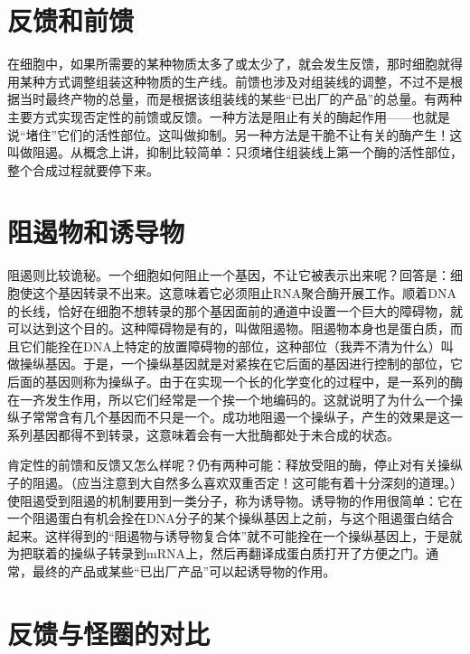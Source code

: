 \section{反馈和前馈}

在细胞中，如果所需要的某种物质太多了或太少了，就会发生反馈，那时细胞就得用某种方式调整组装这种物质的生产线。前馈也涉及对组装线的调整，不过不是根据当时最终产物的总量，而是根据该组装线的某些“已出厂的产品”的总量。有两种主要方式实现否定性的前馈或反馈。一种方法是阻止有关的酶起作用——也就是说“堵住”它们的活性部位。这叫做抑制。另一种方法是干脆不让有关的酶产生！这叫做阻遏。从概念上讲，抑制比较简单：只须堵住组装线上第一个酶的活性部位，整个合成过程就要停下来。

\section{阻遏物和诱导物}

阻遏则比较诡秘。一个细胞如何阻止一个基因，不让它被表示出来呢？回答是：细胞使这个基因转录不出来。这意味着它必须阻止RNA聚合酶开展工作。顺着DNA的长线，恰好在细胞不想转录的那个基因面前的通道中设置一个巨大的障碍物，就可以达到这个目的。这种障碍物是有的，叫做阻遏物。阻遏物本身也是蛋白质，而且它们能拴在DNA上特定的放置障碍物的部位，这种部位（我弄不清为什么）叫做操纵基因。于是，一个操纵基因就是对紧挨在它后面的基因进行控制的部位，它后面的基因则称为操纵子。由于在实现一个长的化学变化的过程中，是一系列的酶在一齐发生作用，所以它们经常是一个挨一个地编码的。这就说明了为什么一个操纵子常常含有几个基因而不只是一个。成功地阻遏一个操纵子，产生的效果是这一系列基因都得不到转录，这意味着会有一大批酶都处于未合成的状态。

肯定性的前馈和反馈又怎么样呢？仍有两种可能：释放受阻的酶，停止对有关操纵子的阻遏。（应当注意到大自然多么喜欢双重否定！这可能有着十分深刻的道理。）使阻遏受到阻遏的机制要用到一类分子，称为诱导物。诱导物的作用很简单：它在一个阻遏蛋白有机会拴在DNA分子的某个操纵基因上之前，与这个阻遏蛋白结合起来。这样得到的“阻遏物与诱导物复合体”就不可能拴在一个操纵基因上，于是就为把联着的操纵子转录到mRNA上，然后再翻译成蛋白质打开了方便之门。通常，最终的产品或某些“已出厂产品”可以起诱导物的作用。

\section{反馈与怪圈的对比}


